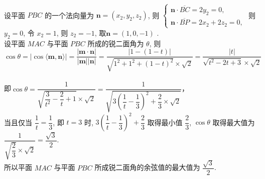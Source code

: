 \documentclass[11pt]{article}
\begin{document}
\\
设平面 $P B C$ 的一个法向量为 $\boldsymbol{n}=\left(x_{2}, y_{2}, z_{2}\right)$,
则 $\left\{\begin{array}{l}\boldsymbol{n} \cdot \overline{B C}=2 y_{2}=0, \\ \boldsymbol{n} \cdot \overline{B P}=2 x_{2}+2 z_{2}=0,\end{array}\right.$
则 $y_{2}=0$, 令 $x_{2}=1$, 则 $z_{2}=-1$,
取$\boldsymbol{n}=(1,0,-1)$ .
\\设平面 $M A C$ 与平面 $P B C$ 所成的锐二面角为 $\theta$,
则 $$\cos \theta=|\cos \langle\boldsymbol{m}, \boldsymbol{n}\rangle|=
\dfrac{|\boldsymbol{m} \cdot \boldsymbol{n}|}{|\boldsymbol{m}||\boldsymbol{n}|}=\dfrac{|1-(1-t)|}{\sqrt{1^{2}+1^{2}+(1-t)^{2}} \times \sqrt{2}}=\dfrac{|t|}{\sqrt{t^{2}-2 t+3} \times \sqrt{2}}$$ 
\\即$\cos \theta=\dfrac{1}{\sqrt{\dfrac{3}{t^{2}}-\dfrac{2}{t}+1} \times \sqrt{2}}=\dfrac{1}{\sqrt{3\left(\dfrac{1}{t}-\dfrac{1}{3}\right)^{2}+\dfrac{2}{3} \times \sqrt{2}}}$，
\\当且仅当 $\dfrac{1}{t}=\dfrac{1}{3}$, 即 $t=3$ 时, $3\left(\dfrac{1}{t}-\dfrac{1}{3}\right)^{2}+\dfrac{2}{3}$ 取得最小值 $\dfrac{2}{3}$,
$\cos \theta$ 取得最大值为 $\dfrac{1}{\sqrt{\dfrac{2}{3}} \times \sqrt{2}}=\dfrac{\sqrt{3}}{2}$.
\\所以平面 $M A C$ 与平面 $P B C$ 所成锐二面角的余弦值的最大值为 $\dfrac{\sqrt{3}}{2}$.
\end{document}
